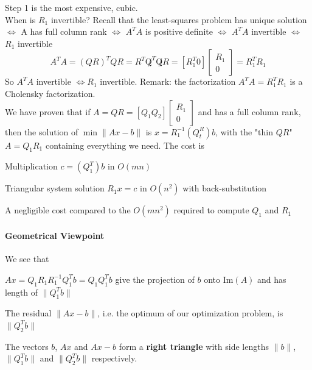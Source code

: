 \documentclass[10pt]{report}
\begin{document}
Step 1 is the most expensive, cubic.\\
When is $R_1$ invertible? Recall that the least-squares problem has unique solution $\Leftrightarrow$ A has full column rank $\Leftrightarrow$ $A^TA$ is positive definite $\Leftrightarrow$ $A^TA$ invertible $\Leftrightarrow$ $R_1$ invertible
$$A^TA = (QR)^TQR = R^T\not Q^T\not QR = [R_1^T 0]\left[\begin{array}{c}
R_1\\0
\end{array}\right] = R_1^TR_1$$
So $A^TA$ invertible $\Leftrightarrow R_1$ invertible. Remark: the factorization $A^TA=R_1^TR_1$ is a Cholensky factorization.\\
We have proven that if $A=QR=\left[Q_1 Q_2\right]\left[\begin{array}{c}R_1\\0\end{array}\right]$ and has a full column rank, then the solution of $\min\|Ax-b\|$ is $x=R_1^{-1}(Q_t^R)b$, with the "thin $QR$" $A=Q_1R_1$ containing everything we need. The cost is \begin{list}{}{}
	\item Multiplication $c = (Q_1^T)b$ in $O(mn)$
	\item Triangular system solution $R_1x = c$ in $O(n^2)$ with back-substitution
\end{list}
A negligible cost compared to the $O(mn^2)$ required to compute $Q_1$ and $R_1$
\paragraph{Geometrical Viewpoint} We see that
\begin{list}{}{}
	\item $Ax = Q_1R_1R_1^{-1}Q_1^Tb = Q_1Q_1^Tb$ give the projection of $b$ onto $\text{Im}(A)$ and has length of $\|Q_1^Tb\|$
	\item The residual $\|Ax-b\|$, i.e. the optimum of our optimization problem, is $\|Q_2^Tb\|$
	\item The vectors $b$, $Ax$ and $Ax-b$ form a \textbf{right triangle} with side lengths $\|b\|$, $\|Q_1^Tb\|$ and $\|Q_2^Tb\|$ respectively.
\end{list}
\end{document}
